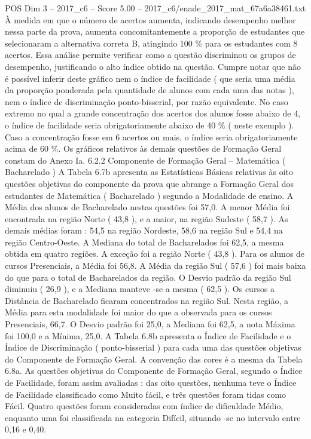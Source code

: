 \begin{textsample}{POS Dim 3 – 2017\_c6 – Score 5.00 – 2017\_c6/enade\_2017\_mat\_67a6a38461.txt}
À medida em que o número de acertos aumenta, indicando desempenho melhor nessa parte da prova, aumenta concomitantemente a proporção de estudantes que selecionaram a alternativa correta B, atingindo 100 \% para os estudantes com 8 acertos.
Essa análise permite verificar como a questão discriminou os grupos de desempenho, justificando o alto índice obtido na questão.
Cumpre notar que não é possível inferir deste gráfico nem o índice de facilidade ( que seria uma média da proporção ponderada pela quantidade de alunos com cada uma das notas ), nem o índice de discriminação ponto-bisserial, por razão equivalente.
No caso extremo no qual a grande concentração dos acertos dos alunos fosse abaixo de 4, o índice de facilidade seria obrigatoriamente abaixo de 40 \% ( neste exemplo ).
Caso a concentração fosse em 6 acertos ou mais, o índice seria obrigatoriamente acima de 60 \%.
Os gráficos relativos às demais questões de Formação Geral constam do Anexo Ia. 6.2.2 Componente de Formação Geral – Matemática ( Bacharelado ) A Tabela 6.7b apresenta as Estatísticas Básicas relativas às oito questões objetivas do componente da prova que abrange a Formação Geral dos estudantes de Matemática ( Bacharelado ) segundo a Modalidade de ensino.
A Média dos alunos de Bacharelado nestas questões foi 57,0.
A menor Média foi encontrada na região Norte ( 43,8 ), e a maior, na região Sudeste ( 58,7 ).
As demais médias foram : 54,5 na região Nordeste, 58,6 na região Sul e 54,4 na região Centro-Oeste.
A Mediana do total de Bacharelados foi 62,5, a mesma obtida em quatro regiões.
A exceção foi a região Norte ( 43,8 ).
Para os alunos de cursos Presenciais, a Média foi 56,8.
A Média da região Sul ( 57,6 ) foi mais baixa do que para o total de Bacharelados da região.
O Desvio padrão da região Sul diminuiu ( 26,9 ), e a Mediana manteve -se a mesma ( 62,5 ).
Os cursos a Distância de Bacharelado ficaram concentrados na região Sul.
Nesta região, a Média para esta modalidade foi maior do que a observada para os cursos Presenciais, 66,7.
O Desvio padrão foi 25,0, a Mediana foi 62,5, a nota Máxima foi 100,0 e a Mínima, 25,0.
A Tabela 6.8b apresenta o Índice de Facilidade e o Índice de Discriminação ( ponto-bisserial ) para cada uma das questões objetivas do Componente de Formação Geral.
A convenção das cores é a mesma da Tabela 6.8a.
As questões objetivas do Componente de Formação Geral, segundo o Índice de Facilidade, foram assim avaliadas : das oito questões, nenhuma teve o Índice de Facilidade classificado como Muito fácil, e três questões foram tidas como Fácil.
Quatro questões foram consideradas com índice de dificuldade Médio, enquanto uma foi classificada na categoria Difícil, situando -se no intervalo entre 0,16 e 0,40.

\end{textsample}
